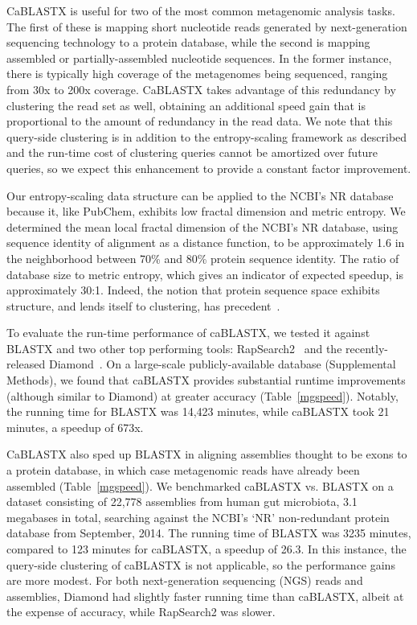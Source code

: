 \documentclass[review,preprint,12pt]{elsarticle}
\renewcommand{\cite}{\citep} %
\theoremstyle{definition}
\theoremstyle{remark}
\numberwithin{equation}{section}
\begin{document}
CaBLASTX is useful for two of the most common metagenomic analysis tasks. 
The first of these is mapping short nucleotide reads generated by next-generation sequencing technology to a protein database,
while the second is mapping assembled or partially-assembled
nucleotide sequences.
In the former instance, there is typically high coverage of the metagenomes
being sequenced, ranging from 30x to 200x coverage.
CaBLASTX takes advantage of this redundancy
by clustering the read set as well, obtaining an additional speed gain that is
proportional to the amount of redundancy in the read data.
We note that this query-side clustering is in addition to the entropy-scaling
framework as described and the run-time cost of clustering queries cannot
be amortized over future queries, so
we expect this enhancement to provide a 
constant factor improvement.

Our entropy-scaling data structure can be applied to the NCBI's NR database because it, 
like PubChem, exhibits low fractal dimension and metric entropy.
We determined the mean local fractal dimension of the NCBI's NR database, using 
sequence identity of alignment as a distance function, to be approximately 1.6 
in the neighborhood between 70\% and 80\% protein sequence identity.
The ratio of database size to metric entropy, which gives an indicator of expected speedup,
is approximately 30:1.
Indeed, the notion that protein sequence space exhibits structure, 
and lends itself to clustering, has precedent~\cite{linial1997global}.

To evaluate the run-time performance of caBLASTX, we tested it against
BLASTX and two other top performing tools: RapSearch2~\cite{zhao2012rapsearch2} and the recently-released
Diamond~\cite{buchfink2014fast}.
On a large-scale publicly-available database (Supplemental Methods), we found that caBLASTX provides substantial runtime improvements 
(although similar to Diamond) at greater accuracy (Table~\ref{mgspeed}).
Notably, the running time for BLASTX was 14,423 minutes, 
while caBLASTX took 21 minutes, a speedup of 673x.

CaBLASTX also sped up BLASTX in aligning assemblies thought to be exons to a protein
database, in which case metagenomic reads have already been 
assembled (Table~\ref{mgspeed}).
We benchmarked caBLASTX vs. BLASTX on a dataset consisting of 22,778 assemblies
from human gut microbiota, 3.1 megabases in total, searching against the NCBI's
`NR' non-redundant protein database from September, 2014.
The running time of BLASTX was 3235 minutes, compared to 123 minutes for 
caBLASTX, a speedup of 26.3.
In this instance, the query-side clustering of caBLASTX is not applicable, so
the performance gains are more modest.
For both next-generation sequencing (NGS) reads and assemblies, Diamond had slightly faster running time than caBLASTX, albeit at the expense of accuracy, while RapSearch2 was slower.
\end{document}
